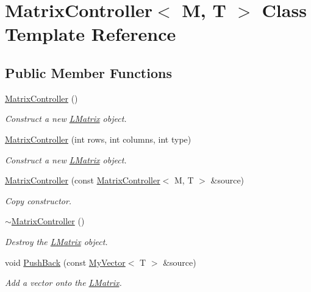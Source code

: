 \hypertarget{class_matrix_controller}{}\section{Matrix\+Controller$<$ M, T $>$ Class Template Reference}
\label{class_matrix_controller}
\subsection*{Public Member Functions}
\begin{DoxyCompactItemize}
\item 
\mbox{\hyperlink{class_matrix_controller_ad3e161e9dfa785fc9e9007b12d79a834}{Matrix\+Controller}} ()
\begin{DoxyCompactList}\small\item\em Construct a new \mbox{\hyperlink{class_l_matrix}{L\+Matrix}} object. \end{DoxyCompactList}\item 
\mbox{\hyperlink{class_matrix_controller_a25d13774e48d029ac6095c9b7637cb23}{Matrix\+Controller}} (int rows, int columns, int type)
\begin{DoxyCompactList}\small\item\em Construct a new \mbox{\hyperlink{class_l_matrix}{L\+Matrix}} object. \end{DoxyCompactList}\item 
\mbox{\hyperlink{class_matrix_controller_a2a97e643dacd9162bb88c680c7169f5c}{Matrix\+Controller}} (const \mbox{\hyperlink{class_matrix_controller}{Matrix\+Controller}}$<$ M, T $>$ \&source)
\begin{DoxyCompactList}\small\item\em Copy constructor. \end{DoxyCompactList}\item 
\mbox{\hyperlink{class_matrix_controller_ac3e8818bb538155c6cb7a46a9ec92ece}{$\sim$\+Matrix\+Controller}} ()
\begin{DoxyCompactList}\small\item\em Destroy the \mbox{\hyperlink{class_l_matrix}{L\+Matrix}} object. \end{DoxyCompactList}\item 
void \mbox{\hyperlink{class_matrix_controller_a5f5411f7f84c53bb02b4f4febb3c4089}{Push\+Back}} (const \mbox{\hyperlink{class_my_vector}{My\+Vector}}$<$ T $>$ \&source)
\begin{DoxyCompactList}\small\item\em Add a vector onto the \mbox{\hyperlink{class_l_matrix}{L\+Matrix}}. \end{DoxyCompactList}\item 

\end{DoxyCompactItemize}
